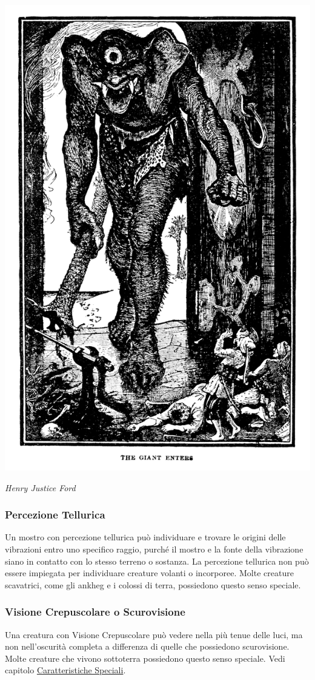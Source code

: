 \begin{multicols}{2}
\begin{center}
	\includegraphics[width=0.7\linewidth]{immagini/ciclope.png}
	
	\emph{Henry Justice Ford}
\end{center}

\subsubsection{Percezione Tellurica}

Un mostro con percezione tellurica può individuare e trovare le origini delle vibrazioni entro uno specifico raggio, purché il mostro e la fonte della vibrazione siano in contatto con lo stesso terreno o sostanza. La percezione tellurica non può essere impiegata per individuare creature volanti o incorporee. Molte creature scavatrici, come gli ankheg e i colossi di terra, possiedono questo senso speciale.

\subsubsection{Visione Crepuscolare o Scurovisione}

Una creatura con Visione Crepuscolare può vedere nella più tenue delle luci, ma non nell'oscurità completa a differenza di quelle che possiedono scurovisione. Molte creature che vivono sottoterra possiedono questo senso speciale. Vedi capitolo \hyperlink{visioneeluce}{Caratteristiche Speciali}.


\end{multicols}
